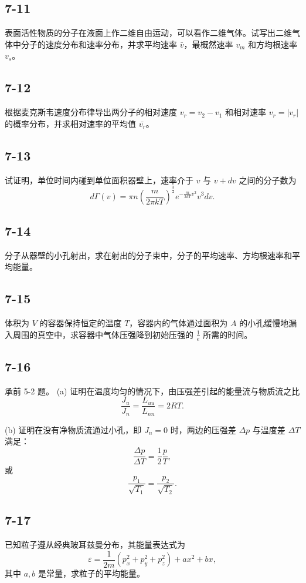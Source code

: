 \newpage
\subsection{7-11}
表面活性物质的分子在液面上作二维自由运动，可以看作二维气体。试写出二维气体中分子的速度分布和速率分布，并求平均速率 $\bar{v}$，最概然速率 $v_m$ 和方均根速率 $v_s$。

\newpage
\subsection{7-12}
根据麦克斯韦速度分布律导出两分子的相对速度 $v_r = v_2 - v_1$ 和相对速率 $v_r = |v_r|$ 的概率分布，并求相对速率的平均值 $\bar{v_r}$。

\newpage
\subsection{7-13}
试证明，单位时间内碰到单位面积器壁上，速率介于 $v$ 与 $v + dv$ 之间的分子数为
$$d\Gamma (v) = \pi n \left( \frac{m}{2 \pi k T} \right)^{\frac{3}{2}} e^{-\frac{m}{2kT} v^{2}} v^{3} dv.$$

\newpage
\subsection{7-14}
分子从器壁的小孔射出，求在射出的分子束中，分子的平均速率、方均根速率和平均能量。

\newpage
\subsection{7-15}
体积为 $V$ 的容器保持恒定的温度 $T$，容器内的气体通过面积为 $A$ 的小孔缓慢地漏入周围的真空中，求容器中气体压强降到初始压强的 $\frac{1}{e}$ 所需的时间。

\newpage
\subsection{7-16}
承前 5-2 题。
(a) 证明在温度均匀的情况下，由压强差引起的能量流与物质流之比
$$\frac{J_u}{J_n} = \frac{L_{uu}}{L_{nn}} = 2RT.$$

(b) 证明在没有净物质流通过小孔，即 $J_n = 0$ 时，两边的压强差 $\Delta p$ 与温度差 $\Delta T$ 满足：
$$\frac{\Delta p}{\Delta T} = \frac{1}{2} \frac{p}{T},$$
或
$$\frac{p_1}{\sqrt{T_1}} = \frac{p_2}{\sqrt{T_2}}.$$

\newpage
\subsection{7-17}
已知粒子遵从经典玻耳兹曼分布，其能量表达式为
$$\varepsilon = \frac{1}{2m}(p_x^2 + p_y^2 + p_z^2) + ax^2 + bx,$$
其中 $a, b$ 是常量，求粒子的平均能量。

